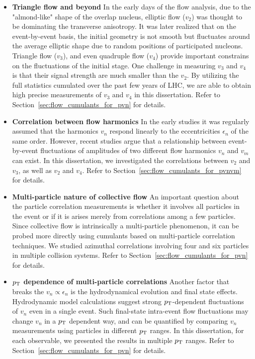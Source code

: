 \begin{itemize}
\item \textbf{Triangle flow and beyond} In the early days of the flow analysis, due to the "almond-like" shape of the overlap nucleus, elliptic flow ($v_2$) was thought to be dominating the transverse anisotropy. It was later realized that on the event-by-event basis, the initial geometry is not smooth but fluctuates around the average elliptic shape due to random positions of participated nucleons. Triangle flow ($v_3$), and even quadruple flow ($v_4$) provide important constrains on the fluctuations of the initial stage. One challenge in measuring $v_3$ and $v_4$ is that their signal strength are much smaller than the $v_2$. By utilizing the full statistics cumulated over the past few years of LHC, we are able to obtain high precise measurements of $v_3$ and $v_4$ in this dissertation. Refer to Section~\ref{sec:flow_cumulants_for_pvn} for details.
\item \textbf{Correlation between flow harmonics} In the early studies it was regularly assumed that the harmonics $v_n$ respond linearly to the eccentricities $\epsilon_n$ of the same order. However, recent studies argue that a relationship between event-by-event fluctuations of amplitudes of two different flow harmonics $v_n$ and $v_m$ can exist. In this dissertation, we investigated the correlations between $v_2$ and $v_3$, as well as $v_2$ and $v_4$. Refer to Section~\ref{sec:flow_cumulants_for_pvnvm} for details.
\item \textbf{Multi-particle nature of collective flow} An important question about the particle correlation measurements is whether it involves all particles in the event or if it is arises merely from correlations among a few particles. Since collective flow is intrinsically a multi-particle phenomenon, it can be probed more directly using cumulants based on multi-particle correlation techniques. We studied azimuthal correlations involving four and six particles in multiple collision systems. Refer to Section~\ref{sec:flow_cumulants_for_pvn} for details.
\item \textbf{$p_\text{T}$ dependence of multi-particle correlations} Another factor that breaks the $v_n \propto \epsilon_n$ is the hydrodynamical evolution and final state effects. Hydrodynamic model calculations suggest strong $p_\text{T}$-dependent fluctuations of $v_n$ even in a single event. Such final-state intra-event flow fluctuations may change $v_n$ in a $p_\text{T}$ dependent way, and can be quantified by comparing $v_n$ measurements using particles in different $p_\text{T}$ ranges. In this dissertation, for each observable, we presented the results in multiple $p_\text{T}$ ranges. Refer to Section~\ref{sec:flow_cumulants_for_pvn} for details.

\end{itemize}
